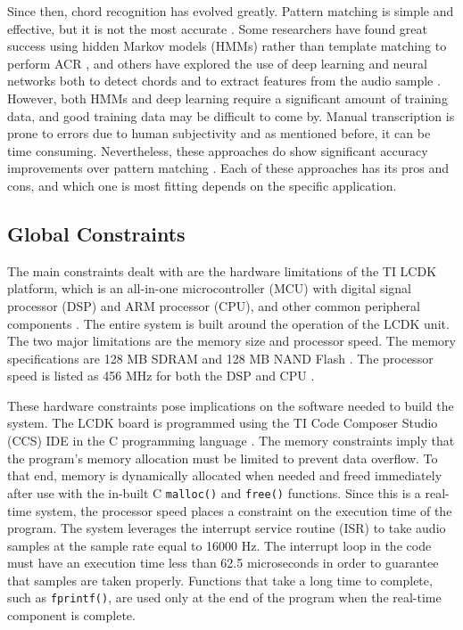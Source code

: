 \documentclass[journal]{IEEEtran}
\begin{document}
Since then, chord recognition has evolved greatly.
Pattern matching is simple and effective, but it is not the most accurate \cite{jiang}.
Some researchers have found great success using hidden Markov models (HMMs) rather than template matching to perform ACR \cite{sheh}, and others have explored the use of deep learning and neural networks both to detect chords \cite{boulanger} and to extract features from the audio sample \cite{korzeniowski}.
However, both HMMs and deep learning require a significant amount of training data, and good training data may be difficult to come by.
Manual transcription is prone to errors due to human subjectivity \cite{pauwels} and as mentioned before, it can be time consuming.
Nevertheless, these approaches do show significant accuracy improvements over pattern matching \cite{jiang, boulanger}.
Each of these approaches has its pros and cons, and which one is most fitting depends on the specific application.


\subsection{Global Constraints}
The main constraints dealt with are the hardware limitations of the TI LCDK platform, which is an all-in-one microcontroller (MCU) with digital signal processor (DSP) and ARM processor (CPU), and other common peripheral components \cite{lcdk}.
The entire system is built around the operation of the LCDK unit.
The two major limitations are the memory size and processor speed.
The memory specifications are 128 MB SDRAM and 128 MB NAND Flash \cite{lcdk}.
The processor speed is listed as 456 MHz for both the DSP and CPU \cite{lcdk}.

These hardware constraints pose implications on the software needed to build the system.
The LCDK board is programmed using the TI Code Composer Studio (CCS) IDE in the C programming language \cite{lcdk}.
The memory constraints imply that the program’s memory allocation must be limited to prevent data overflow.
To that end, memory is dynamically allocated when needed and freed immediately after use with the in-built C \texttt{malloc()} and \texttt{free()} functions.
Since this is a real-time system, the processor speed places a constraint on the execution time of the program.
The system leverages the interrupt service routine (ISR) to take audio samples at the sample rate equal to 16000 Hz.
The interrupt loop in the code must have an execution time less than 62.5 microseconds in order to guarantee that samples are taken properly.
Functions that take a long time to complete, such as \texttt{fprintf()}, are used only at the end of the program when the real-time component is complete.
\end{document}
